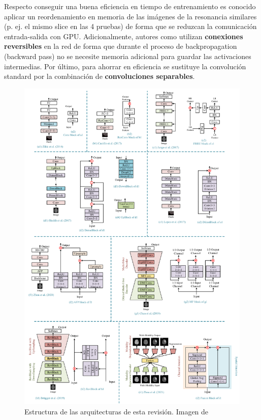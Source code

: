 			Respecto conseguir una buena eficiencia en tiempo de entrenamiento es conocido aplicar un reordenamiento en memoria de las imágenes de la resonancia similares (p. ej. el mismo slice en las 4 pruebas) de forma que se reduzcan la comunicación entrada-salida con GPU. Adicionalmente, autores como \cite{brugger2019partially} utilizan \textbf{conexiones reversibles}  en la red de forma que durante el proceso de backpropagation (backward pass) no se necesite memoria adicional para guardar las activaciones intermedias. Por último, para ahorrar en eficiencia se sustituye la convolución standard por la combinación de \textbf{convoluciones separables}. 
			
			\begin{figure}[!h]
				\centering
				\includegraphics[width=1.0\linewidth]{imagenes/estructura_revisionhistorica.png}
				\caption{Estructura de las arquitecturas de esta revisión. Imagen de \cite{liu2023deep}}
			\end{figure}
			
